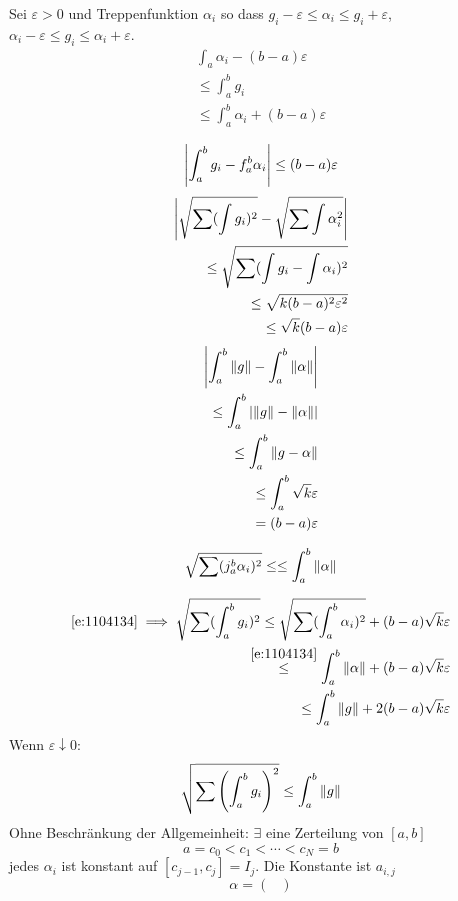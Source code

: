 \begin{Bew}
  Sei $\varepsilon>0$ und Treppenfunktion $\alpha_i$ so dass $g_i-\varepsilon\leq\alpha_i\leq g_i+\varepsilon$, $\alpha_i-\varepsilon\leq g_i\leq \alpha_i+\varepsilon$.
  \begin{eqnarray*}
    \int_a\alpha_i-(b-a)\varepsilon\\
    \leq\int_a^b g_i\\
    \leq \int_a^b\alpha_i+(b-a)\varepsilon\\
  \end{eqnarray*}
  \[\left| \int_a^bg_i-f_a^b\alpha_i \right|\leq (b-a)\varepsilon\]
  \begin{eqnarray*}
    \left| \sqrt{\sum(\int g_i)^2}-\sqrt{\sum\int\alpha_i^2} \right|\\
    \leq\sqrt{\sum(\int g_i-\int \alpha_i)^2}\\
    \leq\sqrt{k(b-a)^2\varepsilon^2}\\
    \leq \sqrt{k}(b-a)\varepsilon
  \end{eqnarray*}
  \begin{eqnarray*}
    \left| \int_a^b\left\| g \right\|-\int_a^b\left\| \alpha \right\| \right|\\
    \leq\int_a^b\left| \left\| g \right\|-\left\| \alpha \right\| \right|\\
    \leq\int_a^b\left\| g-\alpha \right\|\\
    \leq\int_a^b\sqrt{k}\varepsilon\\
    =(b-a)\varepsilon
  \end{eqnarray*}
  \begin{Beh}
    \begin{equation}
      \label{e:1104134}
      \sqrt{\sum(j_a^b\alpha_i)^2}\leq\leq\int_a^b\left\| \alpha \right\|
    \end{equation}
  \end{Beh}
  \begin{eqnarray*}
    \ref{e:1104134}\implies
    \sqrt{\sum(\int_a^b g_i)^2}\leq\sqrt{\sum(\int_a^b\alpha_i)^2}+(b-a)\sqrt{k}\varepsilon \\
    \stackrel{\ref{e:1104134}}{\leq}\int_a^b\left\| \alpha \right\|+(b-a)\sqrt{k}\varepsilon\\
    \leq\int_a^b\left\| g \right\|+2(b-a)\sqrt{k}\varepsilon
  \end{eqnarray*}
  Wenn $\varepsilon\downarrow 0$:
  \[\sqrt{\sum\left( \int_a^bg_i \right)^2}\leq\int_a^b\left\| g \right\|\]
  Ohne Beschränkung der Allgemeinheit: $\exists$ eine Zerteilung von $[a,b]$ 
  \[a=c_0<c_1<\cdots<c_N=b\]
  jedes $\alpha_i$ ist konstant auf $[c_{j-1},c_j]=I_j$. Die Konstante ist $a_{i,j}$
  \[\alpha = \begin{pmatrix}

\end{pmatrix}\]
\end{Bew}
